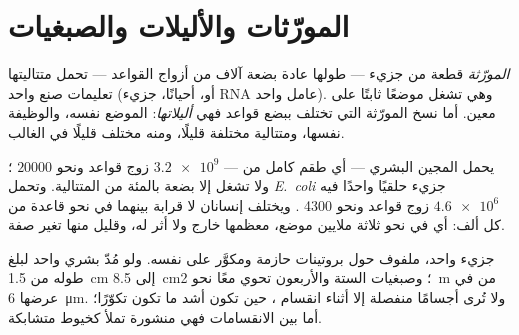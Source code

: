 \section{المورّثات والأليلات والصبغيات}

\begin{definition}\label{def:g10:universal-dna:gene}
\emph{المورّثة} قطعة من جزيء  --- طولها عادة بضعة
آلاف من أزواج القواعد --- تحمل متتاليتها تعليمات صنع  واحد (أو،
أحيانًا، جزيء RNA عامل واحد). وهي تشغل موضعًا ثابتًا على  معين.
أما نسخ المورّثة التي تختلف ببضع قواعد فهي \emph{أليلاتها}:
الموضع نفسه، والوظيفة نفسها، ومتتالية مختلفة قليلًا، ومنه  مختلف
قليلًا في الغالب.
\end{definition}

\begin{example}[أرقام]\label{ex:g10:universal-dna:numbers}
يحمل المجين البشري --- أي طقم كامل من  --- $\num{3.2e9}$ زوج
قواعد ونحو $\num{20000}$ ؛ ولا تشغل  إلا بضعة بالمئة
من المتتالية. وتحمل  \emph{E.~coli} جزيء  حلقيًا واحدًا فيه
$\num{4.6e6}$ زوج قواعد ونحو 4300 . ويختلف إنسانان لا قرابة
بينهما في نحو قاعدة من كل ألف: أي في نحو ثلاثة ملايين موضع، معظمها
خارج  ولا أثر له، وقليل منها  تغير صفة.
\end{example}

\begin{proposition}[الصبغيات]\label{prop:g10:universal-dna:chromosome}
 جزيء  واحد، ملفوف حول بروتينات حازمة ومكوَّر على نفسه.
ولو مُدّ   بشري واحد لبلغ طوله من \qty{1.5}{cm} إلى
\qty{8.5}{cm}؛ وصبغيات  الستة والأربعون تحوي معًا نحو
\qty{2}{m} من  في  عرضها \qty{6}{\micro m}. ولا تُرى 
أجسامًا منفصلة إلا أثناء انقسام ، حين تكون أشد ما تكون تكوّرًا؛
أما بين الانقسامات فهي منشورة تملأ  كخيوط متشابكة.
\end{proposition}
\admitted

